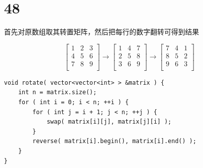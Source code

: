 \documentclass[12pt,a4paper]{article}
\begin{document}
\section{48}
\begin{CJK}{UTF8}{gbsn}
首先对原数组取其转置矩阵，然后把每行的数字翻转可得到结果
\end{CJK}
\[
  \begin{bmatrix}
    1 & 2 & 3  \\
    4 & 5 & 6  \\
	7 & 8 & 9  \\
  \end{bmatrix}
  \rightarrow
  \begin{bmatrix}
    1 & 4 & 7  \\
    2 & 5 & 8  \\
	3 & 6 & 9  \\
  \end{bmatrix}
  \rightarrow
  \begin{bmatrix}
    7 & 4 & 1  \\
    8 & 5 & 2  \\
	9 & 6 & 3  \\
  \end{bmatrix}
\]
\begin{lstlisting}
void rotate( vector<vector<int> > &matrix ) {
	int n = matrix.size();
	for ( int i = 0; i < n; ++i ) {
		for ( int j = i + 1; j < n; ++j ) {
			swap( matrix[i][j], matrix[j][i] );
		}
		reverse( matrix[i].begin(), matrix[i].end() );
	}
}
\end{lstlisting}
\end{document}
